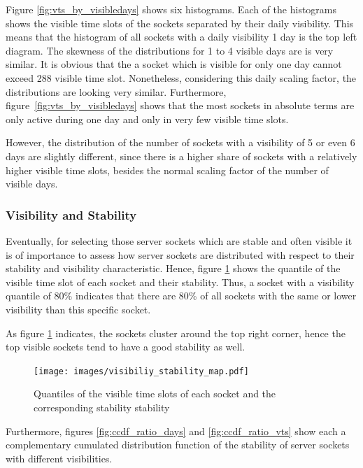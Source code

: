 Figure \ref{fig:vts_by_visibledays} shows six histograms. Each of the histograms shows the visible time slots of the sockets separated by their daily visibility. This means that the histogram of all sockets with a daily visibility 1 day is the top left diagram.  The skewness of the distributions for 1 to 4 visible days are is very similar. 
It is obvious that the a socket which is visible for only one day cannot exceed 288 visible time slot. 
Nonetheless, considering this daily scaling factor, the distributions are looking very similar. 
Furthermore, figure \ref{fig:vts_by_visibledays} shows that the most sockets in absolute terms are only active during one day and only in very few visible time slots.

However, the distribution of the number of sockets with a visibility of 5 or even 6 days are slightly different, since there is a higher share of sockets with a relatively higher visible time slots, besides the normal scaling factor of the number of visible days. 

\subsubsection{Visibility and Stability} Eventually, for selecting those \glspl{server socket} which are stable and often visible it is of importance to assess how \glspl{server socket} are distributed with respect to their stability and visibility characteristic. 
Hence, figure \ref{fig:rankedVisibility} shows the quantile of the visible time slot of each socket and their stability. 
Thus, a socket with a visibility quantile of 80\% indicates that there are 80\% of all sockets with the same or lower visibility than this specific socket.

As figure \ref{fig:rankedVisibility} indicates, the sockets cluster around the top right corner, hence the top visible sockets tend to have a good stability as well. 
\begin{figure}
	[hb] \centering 
	\texttt{[image: images/visibiliy\_stability\_map.pdf]} \caption{Quantiles of the visible time slots of each socket and the corresponding stability stability} 
	\label{fig:rankedVisibility} 
\end{figure}

Furthermore, figures \ref{fig:ccdf_ratio_days} and \ref{fig:ccdf_ratio_vts} show each a complementary cumulated distribution function of the stability of server sockets with different visibilities.

